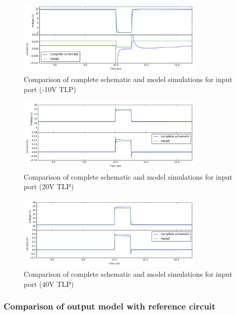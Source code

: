 \begin{figure}[!p]
  \centering
  \includegraphics[width=0.8\textwidth]{src/4/figures/comparison_model_total_m10V.png}
  \caption{Comparison of complete schematic and model simulations for input port (-10V TLP)}
  \label{fig:compare-model-simu-m10}
\end{figure}

\begin{figure}[!p]
  \centering
  \includegraphics[width=0.8\textwidth]{src/4/figures/comparison_model_total_20V.png}
  \caption{Comparison of complete schematic and model simulations for input port (20V TLP)}
  \label{fig:compare-model-simu-20}
\end{figure}

\begin{figure}[!p]
  \centering
  \includegraphics[width=0.8\textwidth]{src/4/figures/comparison_model_total_40V.png}
  \caption{Comparison of complete schematic and model simulations for input port (40V TLP)}
  \label{fig:compare-model-simu-40}
\end{figure}

\subsubsection{Comparison of output model with reference circuit}

